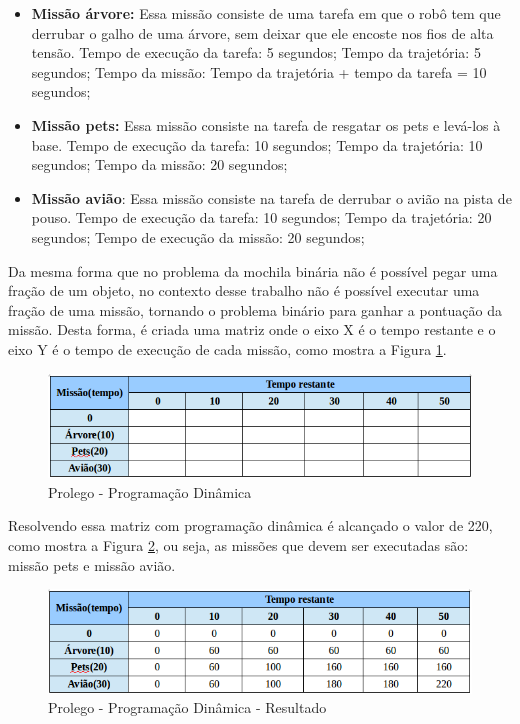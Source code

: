 \begin{itemize}
\item \textbf{Missão árvore:} Essa missão consiste de uma tarefa em que o robô tem que derrubar o galho de uma árvore, sem deixar que ele encoste nos fios de alta tensão. Tempo de execução da tarefa: 5 segundos; Tempo da trajetória: 5 segundos; Tempo da missão: Tempo da trajetória + tempo da tarefa = 10 segundos;
\item \textbf{Missão pets:} Essa missão consiste na tarefa de resgatar os pets e levá-los à base. Tempo de execução da tarefa: 10 segundos; Tempo da trajetória: 10 segundos; Tempo da missão: 20 segundos;
\item \textbf{Missão avião}: Essa missão consiste na tarefa de derrubar o avião na pista de pouso. Tempo de execução da tarefa: 10 segundos; Tempo da trajetória: 20 segundos; Tempo de execução da missão: 20 segundos;
\end{itemize}

Da mesma forma que no problema da mochila binária não é possível pegar uma fração de um objeto, no contexto desse trabalho não é possível executar uma fração de uma missão, tornando o problema binário para ganhar a pontuação da missão. Desta forma, é criada uma matriz onde o eixo X é o tempo restante e o eixo Y é o tempo de execução de cada missão, como mostra a Figura \ref{matrizProlego}.

\FloatBarrier
\begin{figure}[!h]
\centering
\includegraphics[keepaspectratio=true,scale=0.6]{figuras/matrizProlego.png}
\caption{Prolego - Programação Dinâmica}
\label{matrizProlego}
\end{figure}


Resolvendo essa matriz com programação dinâmica é alcançado o valor de 220, como mostra a Figura \ref{matrizProlegoResult}, ou seja, as missões que devem ser executadas são: missão pets e missão avião.  

\FloatBarrier
\begin{figure}[!h]
\centering
\includegraphics[keepaspectratio=true,scale=0.6]{figuras/matrizProlegoResult.png}
\caption{Prolego - Programação Dinâmica - Resultado}
\label{matrizProlegoResult}
\end{figure}


